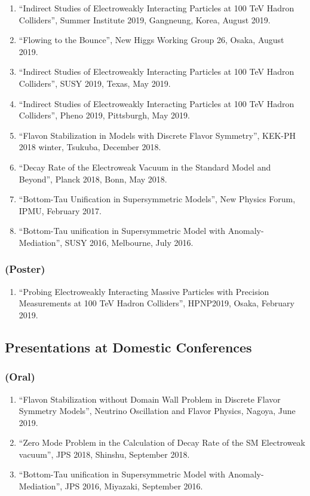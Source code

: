 \documentclass[12pt,notitlepage]{article}
\begin{document}
\begin{enumerate}
 \item ``Indirect Studies of Electroweakly Interacting Particles at 100 TeV Hadron Colliders'', Summer Institute 2019, Gangneung, Korea, August 2019.
 \item ``Flowing to the Bounce'', New Higgs Working Group 26, Osaka, August 2019.
 \item ``Indirect Studies of Electroweakly Interacting Particles at 100 TeV Hadron Colliders'', SUSY 2019, Texas, May 2019.
 \item ``Indirect Studies of Electroweakly Interacting Particles at 100 TeV Hadron Colliders'', Pheno 2019, Pittsburgh, May 2019.
 \item ``Flavon Stabilization in Models with Discrete Flavor Symmetry'', KEK-PH 2018 winter, Tsukuba, December 2018.
 \item ``Decay Rate of the Electroweak Vacuum in the Standard Model and Beyond'', Planck 2018, Bonn, May 2018.
 \item ``Bottom-Tau Unification in Supersymmetric Models'', New Physics Forum, IPMU, February 2017.
 \item ``Bottom-Tau unification in Supersymmetric Model with Anomaly-Mediation'', SUSY 2016, Melbourne, July 2016.
\end{enumerate}

\subsubsection*{(Poster)}

\begin{enumerate}
  \item ``Probing Electroweakly Interacting Massive Particles with Precision Measurements at 100 TeV Hadron Colliders'', HPNP2019, Osaka, February 2019.
\end{enumerate}

\subsection*{Presentations at Domestic Conferences}

\subsubsection*{(Oral)}

\begin{enumerate}
  \item ``Flavon Stabilization without Domain Wall Problem in Discrete Flavor Symmetry Models'', Neutrino Oscillation and Flavor Physics, Nagoya, June 2019.
  \item ``Zero Mode Problem in the Calculation of Decay Rate of the SM Electroweak vacuum'', JPS 2018, Shinshu, September 2018.
  \item ``Bottom-Tau unification in Supersymmetric Model with Anomaly-Mediation'', JPS 2016, Miyazaki, September 2016.
\end{enumerate}
\end{document}
